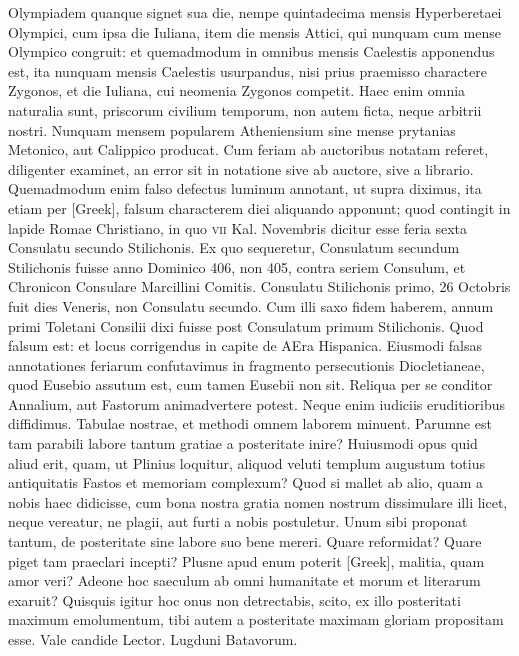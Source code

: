 Olympiadem quanque signet sua die,
nempe quintadecima mensis Hyperberetaei Olympici, cum ipsa die
Iuliana, item die mensis Attici, qui nunquam cum mense Olympico
congruit: et quemadmodum in omnibus mensis Caelestis apponendus
est, ita nunquam mensis Caelestis usurpandus, nisi prius praemisso charactere
Zygonos, et die Iuliana, cui neomenia Zygonos competit.
Haec enim omnia naturalia sunt, priscorum civilium temporum, non
autem ficta, neque arbitrii nostri.
Nunquam mensem popularem Atheniensium
sine mense prytanias Metonico, aut Calippico producat.
Cum feriam ab auctoribus notatam referet, diligenter examinet, an
error sit in notatione sive ab auctore, sive a librario.
Quemadmodum
enim falso defectus luminum annotant, ut supra diximus, ita etiam
per \textgreek{[Greek]}, falsum characterem diei aliquando apponunt;
 quod contingit
in lapide Romae Christiano, in quo \textsc{vii} Kal. Novembris dicitur
esse feria sexta Consulatu secundo Stilichonis.
Ex quo sequeretur, Consulatum
secundum Stilichonis fuisse anno Dominico 406, non 405,
contra seriem Consulum, et Chronicon Consulare Marcillini Comitis.
Consulatu Stilichonis primo, 26 Octobris fuit dies Veneris,
non Consulatu secundo.
Cum illi saxo fidem haberem, annum primi
Toletani Consilii dixi fuisse post Consulatum primum Stilichonis.
Quod falsum est: et locus corrigendus in capite de AEra Hispanica.
Eiusmodi falsas annotationes feriarum confutavimus in fragmento
persecutionis Diocletianeae, quod Eusebio assutum est, cum tamen
Eusebii non sit.
Reliqua per se conditor Annalium, aut Fastorum animadvertere
potest.
Neque enim iudiciis eruditioribus diffidimus.
Tabulae nostrae, et methodi omnem laborem minuent.
Parumne est
tam parabili labore tantum gratiae a posteritate inire?
Huiusmodi
opus quid aliud erit, quam, ut Plinius loquitur, aliquod veluti templum
augustum totius antiquitatis Fastos et memoriam complexum?
Quod si mallet ab alio, quam a nobis haec didicisse, cum bona nostra
gratia nomen nostrum dissimulare illi licet, neque vereatur, ne
plagii, aut furti a nobis postuletur.
Unum sibi proponat tantum, de
posteritate sine labore suo bene mereri.
Quare reformidat?
Quare piget tam praeclari incepti?
Plusne apud enum poterit \textgreek{[Greek]}, malitia,
quam amor veri?
Adeone hoc saeculum ab omni humanitate et
morum et literarum exaruit?
Quisquis igitur hoc onus non detrectabis,
scito, ex illo posteritati maximum emolumentum, tibi autem
a posteritate maximam gloriam propositam esse.
Vale candide
Lector.
Lugduni Batavorum.

